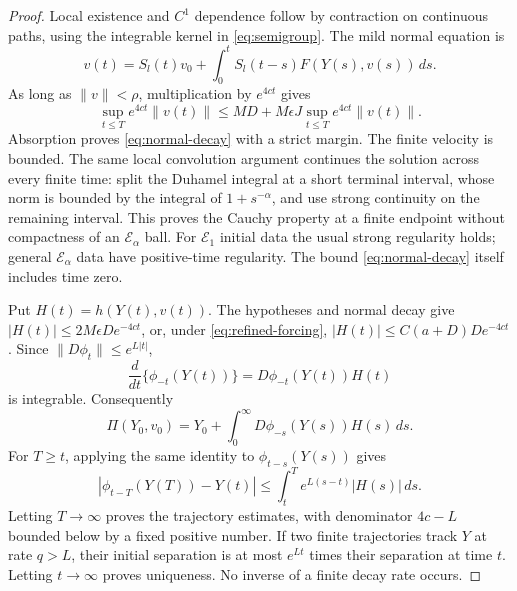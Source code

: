 \documentclass[11pt]{amsart}
\theoremstyle{definition}
\theoremstyle{remark}
\begin{document}
\begin{proof}
Local existence and $C^1$ dependence follow by contraction on
continuous paths, using the integrable kernel in \eqref{eq:semigroup}.
The mild normal equation is
\[
 v(t)=S_l(t)v_0+
       \int_0^tS_l(t-s)F(Y(s),v(s))\,ds.
\]
As long as $\|v\|<\rho$, multiplication by $e^{4ct}$ gives
\[
 \sup_{t\le T}e^{4ct}\|v(t)\|
 \le MD+M\epsilon J\sup_{t\le T}e^{4ct}\|v(t)\|.
\]
Absorption proves \eqref{eq:normal-decay} with a strict margin.
The finite velocity is bounded. The same local convolution argument
continues the solution across every finite time: split the Duhamel
integral at a short terminal interval, whose norm is bounded by
the integral of $1+s^{-\alpha}$, and use strong continuity on the
remaining interval. This proves the Cauchy property at a finite
endpoint without compactness of an $\mathcal E_\alpha$ ball.
For $\mathcal E_1$ initial data the usual strong regularity holds;
general $\mathcal E_\alpha$ data have positive-time regularity.
The bound \eqref{eq:normal-decay} itself includes time zero.

Put $H(t)=h(Y(t),v(t))$. The hypotheses and normal decay give
$|H(t)|\le2M\epsilon D e^{-4ct}$, or, under
\eqref{eq:refined-forcing},
$|H(t)|\le C(a+D)D e^{-4ct}$. Since
$\|D\phi_t\|\le e^{L|t|}$,
\[
 \frac{d}{dt}\{\phi_{-t}(Y(t))\}
       =D\phi_{-t}(Y(t))H(t)
\]
is integrable. Consequently
\begin{equation}\label{eq:phase-integral}
 \Pi(Y_0,v_0)=Y_0+
       \int_0^\infty D\phi_{-s}(Y(s))H(s)\,ds.
\end{equation}
For $T\ge t$, applying the same identity to
$\phi_{t-s}(Y(s))$ gives
\[
 |\phi_{t-T}(Y(T))-Y(t)|
       \le\int_t^T e^{L(s-t)}|H(s)|\,ds .
\]
Letting $T\to\infty$ proves the trajectory estimates, with denominator
$4c-L$ bounded below by a fixed positive number. If two finite
trajectories track $Y$ at rate $q>L$, their initial separation
is at most $e^{Lt}$ times their separation at time $t$.
Letting $t\to\infty$ proves uniqueness. No inverse of a finite
decay rate occurs.


\end{proof}
\end{document}
